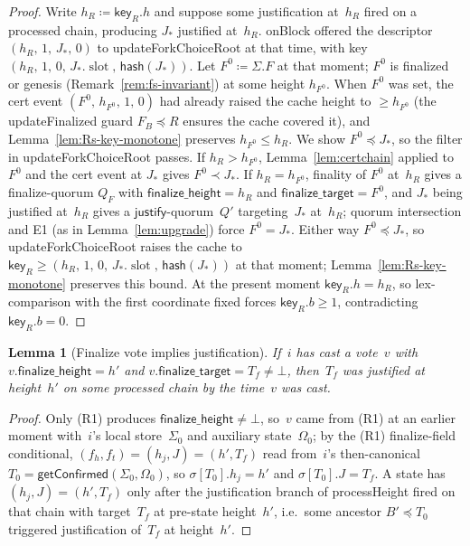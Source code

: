 \ifx\litemode\undefined\documentclass{article}\fi
\newcommand{\slot}[0]{\ensuremath{\operatorname{\mathrm{slot}}}}
\newcommand{\just}{\ensuremath{\mathsf{justify}}\xspace}
\newcommand{\finalizeHeight}{\mathsf{finalize\_height}}
\newcommand{\finalizeTarget}{\mathsf{finalize\_target}}
\newcommand{\hash}{\mathsf{hash}}
\newcommand{\key}{\mathsf{key}}
\newcommand{\processHeight}{\textsf{processHeight}\xspace}
\newcommand{\onBlock}{\textsf{onBlock}\xspace}
\newcommand{\updateForkChoiceRoot}{\textsf{updateForkChoiceRoot}\xspace}
\newcommand{\updateFinalized}{\textsf{updateFinalized}\xspace}
\newcommand{\getConfirmed}{\textsf{getConfirmed}\xspace}
\theoremstyle{plain}
\newtheorem{lemma}{Lemma}
\theoremstyle{definition}
\theoremstyle{remark}
\begin{document}
\begin{proof}
Write $h_R \coloneqq \key_R.h$ and suppose some justification at~$h_R$ fired on a processed chain, producing $J_\ast$ justified at~$h_R$.
\onBlock offered the descriptor $(h_R,\, 1,\, J_\ast,\, 0)$ to \updateForkChoiceRoot at that time, with key $(h_R,\, 1,\, 0,\, J_\ast.\slot,\, \hash(J_\ast))$.
Let $F^0 \coloneqq \Sigma.F$ at that moment; $F^0$ is finalized or genesis (Remark~\ref{rem:fs-invariant}) at some height $h_{F^0}$.
When $F^0$ was set, the cert event $(F^0,\, h_{F^0},\, 1,\, 0)$ had already raised the cache height to $\geq h_{F^0}$ (the \updateFinalized guard $F_B \preceq R$ ensures the cache covered it), and Lemma~\ref{lem:Rs-key-monotone} preserves $h_{F^0} \leq h_R$.
We show $F^0 \preceq J_\ast$, so the filter in \updateForkChoiceRoot passes.
If $h_R > h_{F^0}$, Lemma~\ref{lem:certchain} applied to $F^0$ and the cert event at $J_\ast$ gives $F^0 \prec J_\ast$.
If $h_R = h_{F^0}$, finality of $F^0$ at~$h_R$ gives a finalize-quorum $Q_F$ with $\finalizeHeight = h_R$ and $\finalizeTarget = F^0$, and $J_\ast$ being justified at~$h_R$ gives a \just-quorum~$Q'$ targeting~$J_\ast$ at~$h_R$; quorum intersection and E1 (as in Lemma~\ref{lem:upgrade}) force $F^0 = J_\ast$.
Either way $F^0 \preceq J_\ast$, so \updateForkChoiceRoot raises the cache to $\key_R \geq (h_R,\, 1,\, 0,\, J_\ast.\slot,\, \hash(J_\ast))$ at that moment; Lemma~\ref{lem:Rs-key-monotone} preserves this bound.
At the present moment $\key_R.h = h_R$, so lex-comparison with the first coordinate fixed forces $\key_R.b \geq 1$, contradicting $\key_R.b = 0$.
\end{proof}

\begin{lemma}[Finalize vote implies justification]\label{lem:no-finalize-without-just}
If~$i$ has cast a vote~$v$ with $v.\finalizeHeight = h'$ and $v.\finalizeTarget = T_f \neq \bot$, then~$T_f$ was justified at height~$h'$ on some processed chain by the time~$v$ was cast.
\end{lemma}

\begin{proof}
Only (R1) produces $\finalizeHeight \neq \bot$, so~$v$ came from (R1) at an earlier moment with~$i$'s local store~$\Sigma_0$ and auxiliary state~$\Omega_0$; by the (R1) finalize-field conditional, $(f_h, f_t) = (h_j, J) = (h', T_f)$ read from~$i$'s then-canonical $T_0 = \getConfirmed(\Sigma_0, \Omega_0)$, so $\sigma[T_0].h_j = h'$ and $\sigma[T_0].J = T_f$.
A state has $(h_j, J) = (h', T_f)$ only after the justification branch of \processHeight fired on that chain with target~$T_f$ at pre-state height~$h'$, i.e.\ some ancestor $B' \preceq T_0$ triggered justification of~$T_f$ at height~$h'$.
\end{proof}
\end{document}
